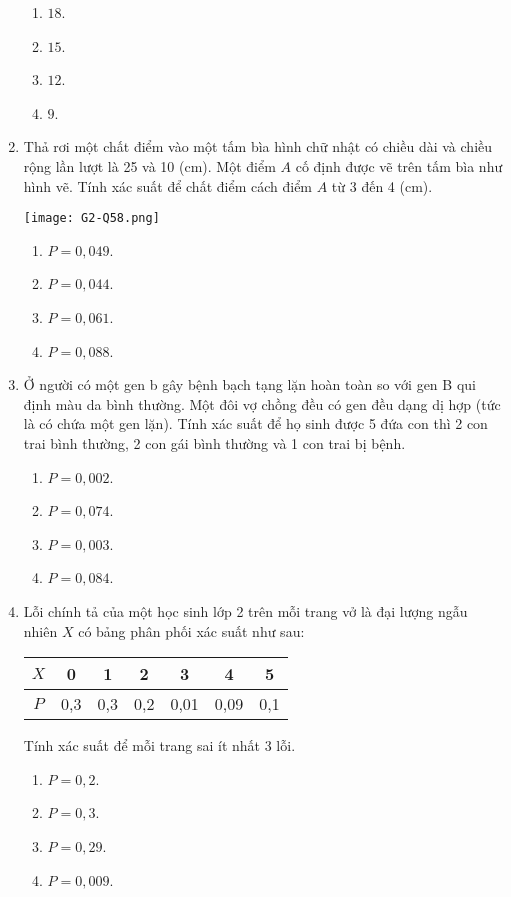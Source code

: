 \begin{enumerate}[label=\textbf{Câu \arabic*.},align=left,left=0cm..0cm,itemindent=*]
	\begin{enumerate}[label=\textbf{\Alph*.},align=left,left=1cm..0cm,itemindent=*]
		\item $18$. \item $15$. \item $12$. \item $9$.
	\end{enumerate}
	\item Thả rơi một chất điểm vào một tấm bìa hình chữ nhật có chiều dài và chiều rộng lần lượt là 25 và 10 (cm). Một điểm $A$ cố định được vẽ trên tấm bìa như hình vẽ. Tính xác suất để chất điểm cách điểm $A$ từ 3 đến 4 (cm).\par
	{\centering\texttt{[image: G2-Q58.png]}\par}
	\begin{enumerate}[label=\textbf{\Alph*.},align=left,left=1cm..0cm,itemindent=*]
		\item $P=0,049$. \item $P=0,044$. \item $P=0,061$. \item $P=0,088$.
	\end{enumerate}
	\item Ở người có một gen b gây bệnh bạch tạng lặn hoàn toàn so với gen B qui định màu da bình thường. Một đôi vợ chồng đều có gen đều dạng dị hợp (tức là có chứa một gen lặn). Tính xác suất để họ sinh được 5 đứa con thì 2 con trai bình thường, 2 con gái bình thường và 1 con trai bị bệnh.
	\begin{enumerate}[label=\textbf{\Alph*.},align=left,left=1cm..0cm,itemindent=*]
		\item $P=0,002$. \item $P=0,074$. \item $P=0,003$. \item $P=0,084$.
	\end{enumerate}
	\item Lỗi chính tả của một học sinh lớp 2 trên mỗi trang vở là đại lượng ngẫu nhiên $X$ có bảng phân phối xác suất như sau:
	\begin{longtable}{|c|c|c|c|c|c|c|}\hline
	$X$ & 0   & 1   & 2   & 3 	& 4 	& 5   \\ \hline
	$P$ & 0,3 & 0,3 & 0,2 & 0,01 & 0,09 & 0,1 \\ \hline
	\end{longtable}
	Tính xác suất để mỗi trang sai ít nhất 3 lỗi.
	\begin{enumerate}[label=\textbf{\Alph*.},align=left,left=1cm..0cm,itemindent=*]
		\item $P=0,2$. \item $P=0,3$. \item $P=0,29$. \item $P=0,009$.

\end{enumerate}
\end{enumerate}
